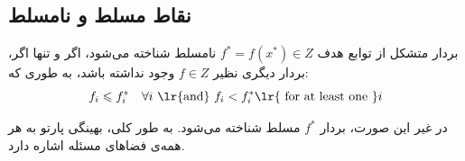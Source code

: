 \subsection{نقاط مسلط و نامسلط}
بردار متشکل از توابع هدف 
$f^*=f(x^*) \in Z$
نامسلط شناخته می‌شود، اگر و تنها اگر، بردار دیگری نظیر 
$f\in Z$
وجود نداشته باشد، به طوری که:
\begin{equation}
	f_i \leq f_i^*\quad \forall i \textrm{  \lr{and}  } f_i < f_i^* \text{\lr{  for at least one }} i
\end{equation}

در غیر این صورت، بردار 
$f^*$
مسلط شناخته می‌شود. به طور کلی، بهینگی پارتو به هر همه‌ی فضاهای مسئله اشاره دارد.